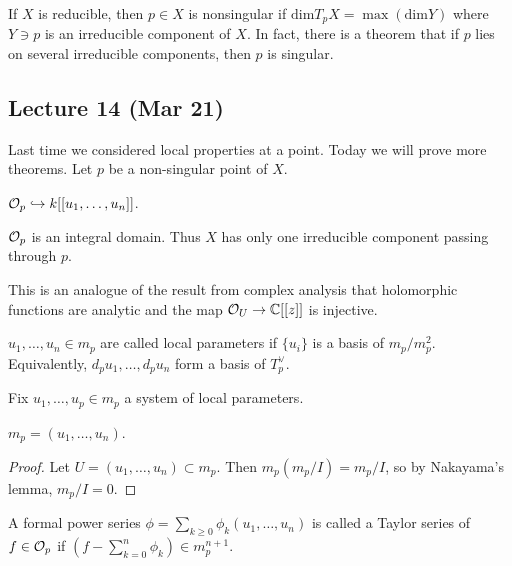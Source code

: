 \documentclass[twoside, 10pt]{article}
\begin{document}
    If $X$ is reducible, then $p \in X$ is nonsingular if $\mathrm{dim}T_p X =
    \max (\mathrm{dim} Y)$ where $Y \ni p$ is an irreducible component of $X$.
    In fact, there is a theorem that if $p$ lies on several irreducible
    components, then $p$ is singular. 

    \subsection{Lecture 14 (Mar 21)}
    
    Last time we considered local properties at a point. Today we will prove
    more theorems. Let $p$ be a non-singular point of $X$.

    \begin{thm} $\mathcal{O}_p \hookrightarrow k[[u_1, \ldots, u_n]]$.  \end{thm}

    \begin{cor} $\mathcal{O}_p$ is an integral domain. Thus $X$ has only one
    irreducible component passing through $p$.  \end{cor}

    \begin{rmk} This is an analogue of the result from complex analysis that
    holomorphic functions are analytic and the map $\mathcal{O}_U \to \mathbb{C}[[z]]$
is injective.  \end{rmk}

    \begin{defn} $u_1, \ldots, u_n \in m_p$ are called local parameters if
    $\{u_i\}$ is a basis of $m_p/m_p^2$. Equivalently, $d_p u_1, \ldots, d_p
u_n$ form a basis of $T_p^{\vee}$.  \end{defn}
    
    Fix $u_1, \ldots, u_p \in m_p$ a system of local parameters. 

    \begin{lem} $m_p = (u_1, \ldots, u_n)$.  \begin{proof} Let $U = (u_1,
    \ldots, u_n) \subset m_p$. Then $m_p (m_p/I) = m_p/I$, so by Nakayama's
lemma, $m_p/I = 0$.  \end{proof} \end{lem}

    \begin{defn} A formal power series $\phi = \sum_{k \geq 0} \phi_k(u_1,
    \ldots, u_n)$ is called a Taylor series of $f \in \mathcal{O}_p$ if $\left( f -
\sum_{k=0}^n \phi_k \right) \in m_p^{n+1}$.  \end{defn}
\end{document}
